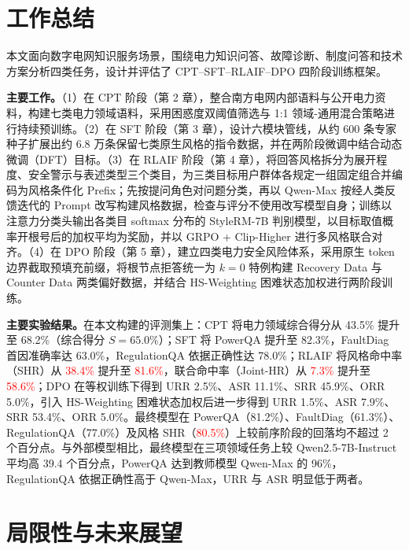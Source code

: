 \documentclass[fontset=fandol,type=master,campus=shenzhen,etitleauto=true]{hithesisbook}
\newcommand{\rev}[1]{\textcolor{red}{#1}}
\begin{document}
\backmatter
\begin{conclusions}
\label{ux603bux7ed3ux4e0eux5c55ux671b}

\section*{工作总结}\label{ux5de5ux4f5cux603bux7ed3}

本文面向数字电网知识服务场景，围绕电力知识问答、故障诊断、制度问答和技术方案分析四类任务，设计并评估了 CPT--SFT--RLAIF--DPO 四阶段训练框架。

\textbf{主要工作。}（1）在 CPT 阶段（第 2 章），整合南方电网内部语料与公开电力资料，构建七类电力领域语料，采用困惑度双阈值筛选与 1:1 领域-通用混合策略进行持续预训练。（2）在 SFT 阶段（第 3 章），设计六模块管线，从约 600 条专家种子扩展出约 6.8 万条保留七类原生风格的指令数据，并在两阶段微调中结合动态微调（DFT）目标。（3）在 RLAIF 阶段（第 4 章），将回答风格拆分为展开程度、安全警示与表述类型三个类目，为三类目标用户群体各规定一组固定组合并编码为风格条件化 Prefix；先按提问角色对问题分类，再以 Qwen-Max 按经人类反馈迭代的 Prompt 改写构建风格数据，检查与评分不使用改写模型自身；训练以注意力分类头输出各类目 softmax 分布的 StyleRM-7B 判别模型，以目标取值概率开根号后的加权平均为奖励，并以 GRPO + Clip-Higher 进行多风格联合对齐。（4）在 DPO 阶段（第 5 章），建立四类电力安全风险体系，采用原生 token 边界截取预填充前缀，将根节点拒答统一为 $k=0$ 特例构建 Recovery Data 与 Counter Data 两类偏好数据，并结合 HS-Weighting 困难状态加权进行两阶段训练。

\textbf{主要实验结果。}在本文构建的评测集上：CPT 将电力领域综合得分从 43.5\% 提升至 68.2\%（综合得分 $S=65.0\%$）；SFT 将 PowerQA 提升至 82.3\%，FaultDiag 首因准确率达 63.0\%，RegulationQA 依据正确性达 78.0\%；RLAIF 将风格命中率（SHR）从 \rev{38.4\%} 提升至 \rev{81.6\%}，联合命中率（Joint-HR）从 \rev{7.3\%} 提升至 \rev{58.6\%}；DPO 在等权训练下得到 URR 2.5\%、ASR 11.1\%、SRR 45.9\%、ORR 5.0\%，引入 HS-Weighting 困难状态加权后进一步得到 URR 1.5\%、ASR 7.9\%、SRR 53.4\%、ORR 5.0\%。最终模型在 PowerQA（81.2\%）、FaultDiag（61.3\%）、RegulationQA（77.0\%）及风格 SHR（\rev{80.5\%}）上较前序阶段的回落均不超过 2 个百分点。与外部模型相比，最终模型在三项领域任务上较 Qwen2.5-7B-Instruct 平均高 39.4 个百分点，PowerQA 达到教师模型 Qwen-Max 的 96\%，RegulationQA 依据正确性高于 Qwen-Max，URR 与 ASR 明显低于两者。

\section*{局限性与未来展望}\label{ux5c40ux9650ux6027ux4e0eux672aux6765ux5c55ux671b}


\end{conclusions}
\end{document}
